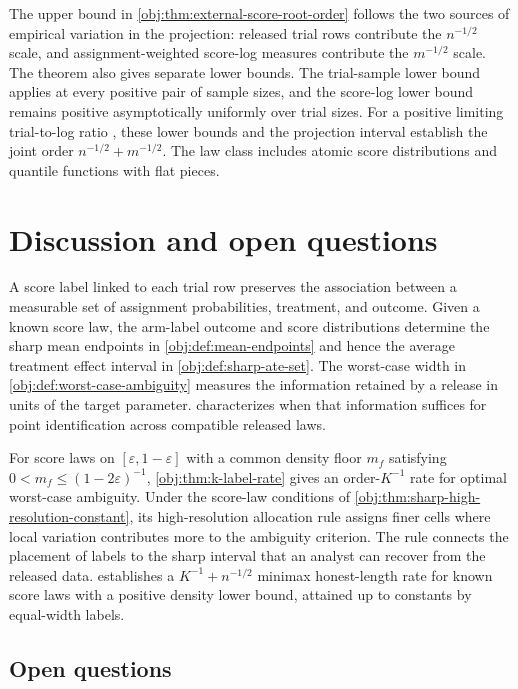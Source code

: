 \documentclass[11pt]{article}
\begin{document}
The upper bound in \cref{obj:thm:external-score-root-order} follows the two sources of empirical variation in the projection: released trial rows contribute the \(n^{-1/2}\) scale, and assignment-weighted score-log measures contribute the \(m^{-1/2}\) scale. The theorem also gives separate lower bounds. The trial-sample lower bound applies at every positive pair of sample sizes, and the score-log lower bound remains positive asymptotically uniformly over trial sizes. For a positive limiting trial-to-log ratio , these lower bounds and the projection interval establish the joint order \(n^{-1/2}+m^{-1/2}\). The law class includes atomic score distributions and quantile functions with flat pieces.


\section{Discussion and open questions}

A score label linked to each trial row preserves the association between a measurable set of assignment probabilities, treatment, and outcome. Given a known score law, the arm-label outcome and score distributions determine the sharp mean endpoints in \cref{obj:def:mean-endpoints} and hence the average treatment effect interval in \cref{obj:def:sharp-ate-set}. The worst-case width in \cref{obj:def:worst-case-ambiguity} measures the information retained by a release in units of the target parameter.  characterizes when that information suffices for point identification across compatible released laws.

For score laws on \([\varepsilon,1-\varepsilon]\) with a common density floor \(m_f\) satisfying \(0<m_f\le(1-2\varepsilon)^{-1}\), \cref{obj:thm:k-label-rate} gives an order-\(K^{-1}\) rate for optimal worst-case ambiguity. Under the score-law conditions of \cref{obj:thm:sharp-high-resolution-constant}, its high-resolution allocation rule assigns finer cells where local variation contributes more to the ambiguity criterion. The rule connects the placement of labels to the sharp interval that an analyst can recover from the released data.  establishes a \(K^{-1}+n^{-1/2}\) minimax honest-length rate for known score laws with a positive density lower bound, attained up to constants by equal-width labels.

\subsection{Open questions}
\end{document}
